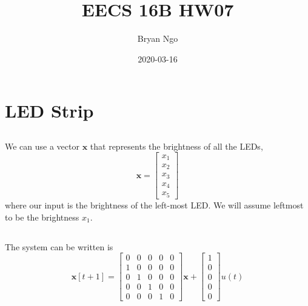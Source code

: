 \documentclass[]{article}
\title{EECS 16B HW07}
\author{Bryan Ngo}
\date{2020-03-16}
\begin{document}
\maketitle

\section{LED Strip}

\subsection{}

We can use a vector \(\bm{x}\) that represents the brightness of all the LEDs,
\begin{equation}
	\bm{x} = \begin{bmatrix}
	x_1 \\
	x_2 \\
	x_3 \\
	x_4 \\
	x_5
	\end{bmatrix}
\end{equation}
where our input is the brightness of the left-most LED.
We will assume leftmost to be the brightness \(x_1\).

\subsection{}

The system can be written is
\begin{equation}
	\bm{x}[t + 1] =
	\begin{bmatrix}
	0 & 0 & 0 & 0 & 0 \\
	1 & 0 & 0 & 0 & 0 \\
	0 & 1 & 0 & 0 & 0 \\
	0 & 0 & 1 & 0 & 0 \\
	0 & 0 & 0 & 1 & 0
	\end{bmatrix} \bm{x}
	+
	\begin{bmatrix}
	1 \\
	0 \\
	0 \\
	0 \\
	0
	\end{bmatrix} u(t)
\end{equation}

\subsection{}
\end{document}
